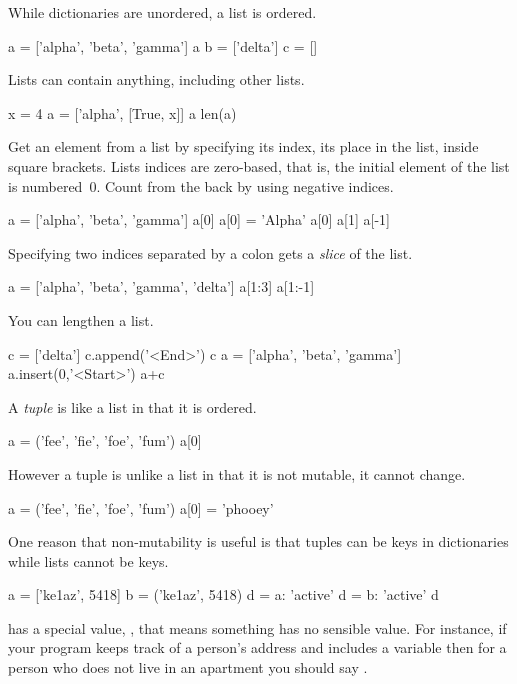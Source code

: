 While dictionaries are unordered, a \python{} list is ordered.
\begin{pythonconsole}
a = ['alpha', 'beta', 'gamma']
a
b = ['delta']
c = []
\end{pythonconsole}
Lists can contain anything, including other lists.
\begin{pythonconsole}
x = 4
a = ['alpha', [True, x]]
a
len(a)
\end{pythonconsole}
Get an element from a list by specifying its index, its place in the list,
inside square brackets.
Lists indices are zero-based, that is, the initial element of the
list is numbered~$0$.
Count from the back by using negative indices.
\begin{pythonconsole}
a = ['alpha', 'beta', 'gamma']
a[0]
a[0] = 'Alpha'
a[0]
a[1]
a[-1]
\end{pythonconsole}
Specifying two indices separated by a colon gets a \textit{slice} 
of the list. 
\begin{pythonconsole} 
a = ['alpha', 'beta', 'gamma', 'delta']
a[1:3]
a[1:-1]
\end{pythonconsole}
You can lengthen a list.
\begin{pythonconsole}
c = ['delta']
c.append('<End>')
c
a = ['alpha', 'beta', 'gamma']
a.insert(0,'<Start>')
a+c
\end{pythonconsole}

A \textit{tuple} is like a list in that it is ordered.
\begin{pythonconsole}
a = ('fee', 'fie', 'foe', 'fum')
a[0]
\end{pythonconsole}
However a tuple is unlike a list 
in that it is not mutable, it cannot change.
\begin{pythonconsole}
a = ('fee', 'fie', 'foe', 'fum')
a[0] = 'phooey'
\end{pythonconsole}
One reason that non-mutability is useful is that 
tuples can be keys in dictionaries while lists cannot be keys.
\begin{pythonconsole}
a = ['ke1az', 5418]
b = ('ke1az', 5418)
d = {a: 'active'}
d = {b: 'active'}
d
\end{pythonconsole}

\python{} has a special value, , that
means something has no sensible value.
For instance, if your program keeps track of a person's address and
includes a variable  then   
for a person who does not live in an
apartment you should say .



